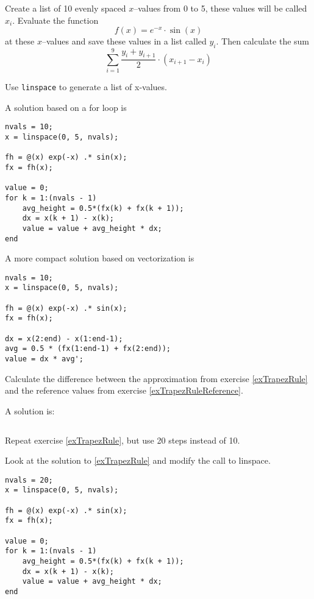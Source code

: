\begin{ex}\label{exTrapezRule}%
Create a list of 10 evenly spaced $x$--values from 
0 to 5, these values will be called $x_i$.
Evaluate the function 
\[
f(x) = e^{-x} \cdot \sin(x)
\]
at these $x$--values and save these values in 
a list called $y_i$.
Then calculate the sum
\[
\sum_{i = 1}^{9} \frac{y_i + y_{i + 1}}{2} \cdot (x_{i + 1} - x_i)
\]
\begin{hint}
Use \verb!linspace! to generate a list of x-values.
\end{hint}
\begin{sol}
A solution based on a for loop is
\begin{lstlisting}
nvals = 10;
x = linspace(0, 5, nvals);

fh = @(x) exp(-x) .* sin(x);
fx = fh(x);

value = 0;
for k = 1:(nvals - 1)
    avg_height = 0.5*(fx(k) + fx(k + 1));
    dx = x(k + 1) - x(k);
    value = value + avg_height * dx;
end
\end{lstlisting}

A more compact solution based on vectorization
is 
\begin{lstlisting}
nvals = 10;
x = linspace(0, 5, nvals);

fh = @(x) exp(-x) .* sin(x);
fx = fh(x);

dx = x(2:end) - x(1:end-1);
avg = 0.5 * (fx(1:end-1) + fx(2:end));
value = dx * avg';
\end{lstlisting}
\end{sol}
\end{ex}

\begin{ex}[Error]%
Calculate the difference between the approximation from 
exercise \ref{exTrapezRule} and the reference values from 
exercise \ref{exTrapezRuleReference}.
\begin{hint}
\end{hint}
\begin{sol}
A solution is:
\begin{lstlisting}
\end{lstlisting}
\end{sol}
\end{ex}


\begin{ex}%
Repeat exercise \ref{exTrapezRule}, but use 20 steps instead of 10.
\begin{hint}
Look at the solution to \ref{exTrapezRule} and modify the call to linspace.
\end{hint}
\begin{sol}
\begin{lstlisting}
nvals = 20;
x = linspace(0, 5, nvals);

fh = @(x) exp(-x) .* sin(x);
fx = fh(x);

value = 0;
for k = 1:(nvals - 1)
    avg_height = 0.5*(fx(k) + fx(k + 1));
    dx = x(k + 1) - x(k);
    value = value + avg_height * dx;
end
\end{lstlisting}
\end{sol}
\end{ex}

